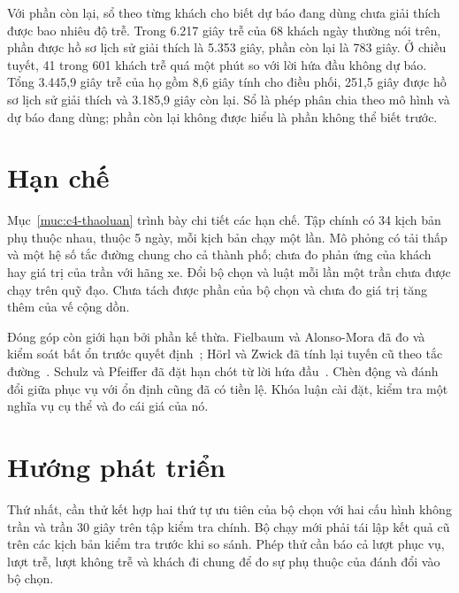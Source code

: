 Với phần còn lại, sổ theo từng khách cho biết dự báo đang dùng chưa giải thích được bao nhiêu độ trễ. Trong 6.217 giây trễ của 68 khách ngày thường nói trên, phần được hồ sơ lịch sử giải thích là 5.353 giây, phần còn lại là 783 giây. Ở chiều tuyết, 41 trong 601 khách trễ quá một phút so với lời hứa đầu không dự báo. Tổng 3.445,9 giây trễ của họ gồm 8,6 giây tính cho điều phối, 251,5 giây được hồ sơ lịch sử giải thích và 3.185,9 giây còn lại. Sổ là phép phân chia theo mô hình và dự báo đang dùng; phần còn lại không được hiểu là phần không thể biết trước.

\section{Hạn chế}
\label{muc:c5-hanche}

Mục~\ref{muc:c4-thaoluan} trình bày chi tiết các hạn chế. Tập chính có 34 kịch bản phụ thuộc nhau, thuộc 5 ngày, mỗi kịch bản chạy một lần. Mô phỏng có tải thấp và một hệ số tắc đường chung cho cả thành phố; chưa đo phản ứng của khách hay giá trị của trần với hãng xe. Đổi bộ chọn và luật mỗi lần một trần chưa được chạy trên quỹ đạo. Chưa tách được phần của bộ chọn và chưa đo giá trị tăng thêm của vế cộng dồn.

Đóng góp còn giới hạn bởi phần kế thừa. Fielbaum và Alonso-Mora đã đo và kiểm soát bất ổn trước quyết định~\cite{fielbaum2020}; Hörl và Zwick đã tính lại tuyến cũ theo tắc đường~\cite{horl2022}. Schulz và Pfeiffer đã đặt hạn chót từ lời hứa đầu~\cite{schulz2026}. Chèn động và đánh đổi giữa phục vụ với ổn định cũng đã có tiền lệ. Khóa luận cài đặt, kiểm tra một nghĩa vụ cụ thể và đo cái giá của nó.

\section{Hướng phát triển}
\label{muc:c5-huongphattrien}

Thứ nhất, cần thử kết hợp hai thứ tự ưu tiên của bộ chọn với hai cấu hình không trần và trần 30 giây trên tập kiểm tra chính. Bộ chạy mới phải tái lập kết quả cũ trên các kịch bản kiểm tra trước khi so sánh. Phép thử cần báo cả lượt phục vụ, lượt trễ, lượt không trễ và khách đi chung để đo sự phụ thuộc của đánh đổi vào bộ chọn.


